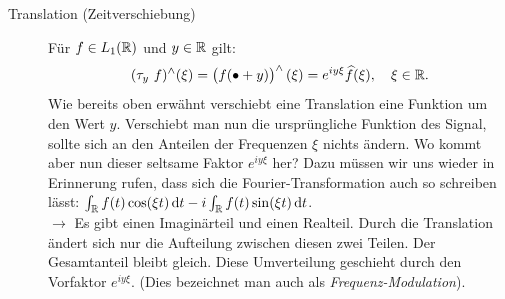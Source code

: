 \begin{remark}
\begin{description}
		\item [Translation (Zeitverschiebung)] Für $ f \in L_1(\mathbb{R}) $ und $ y \in \mathbb{R} $ gilt:
		\[ 
    		(\tau_{y} \ f)^{\wedge}(\xi) 
  		= \left( f(\bullet + y) \right)^{\wedge}(\xi) 
  		= e^{iy\xi}\widehat{f}(\xi), \quad \xi \in \mathbb{R}.
    \]
		Wie bereits oben erwähnt verschiebt eine Translation eine Funktion um den Wert $ y $. 
		Verschiebt man nun die ursprüngliche Funktion des Signal, sollte sich an den Anteilen der 
		Frequenzen $ \xi $ nichts ändern. Wo kommt aber nun dieser seltsame Faktor $ e^{iy\xi} $ her? 
		Dazu müssen wir uns wieder in Erinnerung rufen, dass sich die Fourier-Transformation auch so 
		schreiben lässt: $ \int_{\R} f(t) \cos(\xi t) \dif t - i \int_{\R} f(t) \sin(\xi t) \dif t $.\\
		$ \rightarrow $ Es gibt einen Imaginärteil und einen Realteil. Durch die Translation ändert 
		sich nur die Aufteilung zwischen diesen zwei Teilen. Der Gesamtanteil bleibt gleich. Diese 
		Umverteilung geschieht durch den Vorfaktor $ e^{iy\xi} $. (Dies bezeichnet man auch als
		\emph{Frequenz-Modulation}). 
		

\end{description}
\end{remark}
